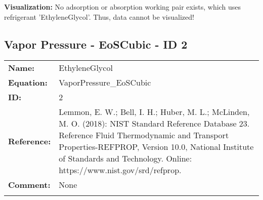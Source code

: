 \textbf{Visualization:}
%
\newline
No adsorption or absorption working pair exists, which uses refrigerant 'EthyleneGlycol'. Thus, data cannot be visualized!
%

\FloatBarrier
\newpage
\subsection{Vapor Pressure - EoSCubic - ID 2}
%
\begin{tabular}[l]{|lp{11.5cm}|}
\hline
\addlinespace

\textbf{Name:} & EthyleneGlycol \\
\textbf{Equation:} & VaporPressure\_EoSCubic \\
\textbf{ID:} & 2 \\
\textbf{Reference:} & Lemmon, E. W.; Bell, I. H.; Huber, M. L.; McLinden, M. O. (2018): NIST Standard Reference Database 23. Reference Fluid Thermodynamic and Transport Properties-REFPROP, Version 10.0, National Institute of Standards and Technology. Online: https://www.nist.gov/srd/refprop. \\
\textbf{Comment:} & None \\

\addlinespace
\hline
\end{tabular}
\newline

